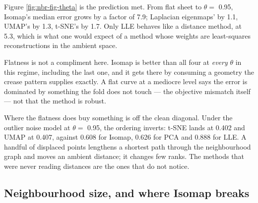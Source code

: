 \documentclass[
  british,
  a4paper,
]{book}
\begin{document}
Figure \ref{fig:nbr-fig-theta} is the prediction met. From flat sheet to
\(\theta =\) 0.95, Isomap's median error grows by a factor of
7.9; Laplacian eigenmaps' by
1.1, UMAP's by
1.3, t-SNE's by
1.7. Only LLE behaves like a distance method, at
5.3, which is what one would expect of a method
whose weights are least-squares reconstructions in the ambient space.

Flatness is not a compliment here. Isomap is better than all four at \emph{every}
\(\theta\) in this regime, including the last one, and it gets there by
consuming a geometry the crease pattern supplies exactly. A flat curve at a
mediocre level says the error is dominated by something the fold does not
touch --- the objective mismatch itself --- not that the method is robust.

Where the flatness does buy something is off the clean diagonal. Under the
outlier noise model at \(\theta =\) 0.95, the ordering inverts: t-SNE
lands at 0.402 and UMAP at
0.407, against 0.608 for
Isomap, 0.626 for PCA and
0.888 for LLE. A handful of displaced points
lengthens a shortest path through the neighbourhood graph and moves an ambient
distance; it changes few ranks. The methods that were never reading distances
are the ones that do not notice.

\subsection{Neighbourhood size, and where Isomap breaks}\label{neighbourhood-size-and-where-isomap-breaks}
\end{document}
